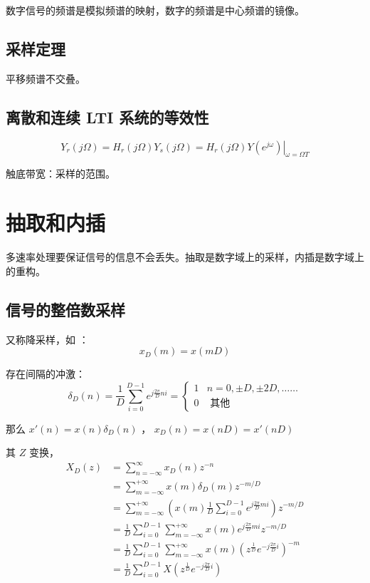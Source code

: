 \documentclass[cn,11pt,chinese,black,simple]{../elegantbook}
\begin{document}
数字信号的频谱是模拟频谱的映射，数字的频谱是中心频谱的镜像。

\subsection{采样定理}

平移频谱不交叠。

\subsection{离散和连续 LTI 系统的等效性}

\[Y_{r}(j \Omega)=H_{r}(j \Omega) Y_{s}(j \Omega)=\left.H_{r}(j \Omega) Y\left(e^{j \omega}\right)\right|_{\omega=\Omega T}\]

触底带宽：采样的范围。

\section{抽取和内插}

多速率处理要保证信号的信息不会丢失。抽取是数字域上的采样，内插是数字域上的重构。

\subsection{信号的整倍数采样}

又称降采样，如  ： \[x_D(m) = x(mD)\]  


存在间隔的冲激： \[\delta_{D}(n)=\frac{1}{D} \sum_{i=0}^{D-1} e^{j \frac{2 \pi}{D} n i}=\left\{\begin{array}{ll}
    1 & n=0, \pm D, \pm 2 D, \ldots \ldots \\
    0 & \text { 其他 }
    \end{array}\right.\]

那么 \(x'(n) = x(n) \delta_D(n)\)  ， \(x_D(n) = x(nD) = x'(nD)\) 

其 \(Z\) 变换， \[\begin{aligned}
    X_D(z) &= \sum_{n=-\infty}^\infty x_D(n) z^{-n} \\ 
    &=\sum_{m=-\infty}^{+\infty} x(m) \delta_{D}(m) z^{-m / D} \\
    &=\sum_{m=-\infty}^{+\infty}\left(x(m) \frac{1}{D} \sum_{i=0}^{D-1} e^{j \frac{2 \pi}{D} m i}\right) z^{-m / D} \\
    &=\frac{1}{D} \sum_{i=0}^{D-1} \sum_{m=-\infty}^{+\infty} x(m) e^{j \frac{2 \pi}{D} m i} z^{-m / D} \\
    &=\frac{1}{D} \sum_{i=0}^{D-1} \sum_{m=-\infty}^{+\infty} x(m)\left(z^{\frac{1}{D}} e^{-j \frac{2 \pi}{D} i}\right)^{-m} \\
    &=\frac{1}{D} \sum_{i=0}^{D-1} X\left(z^{\frac{1}{D}} e^{-j \frac{2 \pi}{D} i}\right)
\end{aligned}\]
\end{document}
